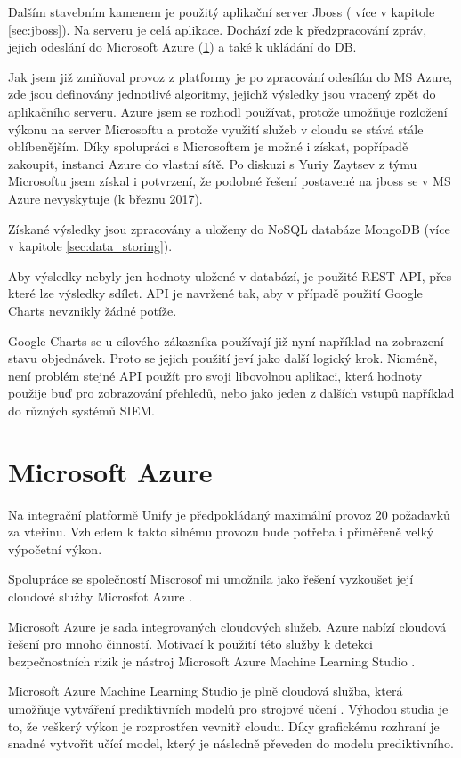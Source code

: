 \documentclass[thesis=M,czech]{FITthesis}[2012/10/20]
\begin{document}
	Dalším stavebním kamenem je použitý aplikační server Jboss ( více v kapitole \ref{sec:jboss}). Na serveru je celá aplikace. Dochází zde k předzpracování zpráv, jejich odeslání do Microsoft Azure (\ref{sec:ms_azure}) a také k ukládání do DB.
	
	Jak jsem již zmiňoval provoz z platformy je po zpracování odesílán do MS Azure, zde jsou definovány jednotlivé algoritmy, jejichž výsledky jsou vracený zpět do aplikačního serveru. Azure jsem se rozhodl používat, protože umožňuje rozložení výkonu na server Microsoftu a protože využití služeb v cloudu se stává stále oblíbenějším. Díky spolupráci s Microsoftem je možné i získat, popřípadě zakoupit, instanci Azure do vlastní sítě. Po diskuzi s Yuriy Zaytsev z týmu Microsoftu jsem získal i potvrzení, že podobné řešení postavené na jboss se v MS Azure nevyskytuje (k březnu 2017).
	
	Získané výsledky jsou zpracovány a uloženy do NoSQL databáze MongoDB (více v kapitole \ref{sec:data_storing}).
	
	Aby výsledky nebyly jen hodnoty uložené v databází, je použité REST API, přes které lze výsledky sdílet. API je navržené tak, aby v případě použití Google Charts nevznikly žádné potíže. 
	
	Google Charts se u cílového zákazníka používají již nyní například na zobrazení stavu objednávek. Proto se jejich použití jeví jako další logický krok. Nicméně, není problém stejné API použít pro svoji libovolnou aplikaci, která hodnoty použije buď pro zobrazování přehledů, nebo jako jeden z dalších vstupů například do různých systémů SIEM.

	\section{Microsoft Azure}
		\label{sec:ms_azure}
		Na integrační platformě Unify \cite{unify} je předpokládaný maximální provoz 20 požadavků za vteřinu. Vzhledem k takto silnému provozu bude potřeba i přiměřeně velký výpočetní výkon. 
			
		Spolupráce se společností Miscrosof \cite{microsoft} mi umožnila jako řešení vyzkoušet její cloudové služby Microsfot Azure \cite{msAzure}.
			
		Microsoft Azure je sada integrovaných cloudových služeb. Azure nabízí cloudová řešení pro mnoho činností. Motivací k použití této služby k detekci bezpečnostních rizik je nástroj Microsoft Azure Machine Learning Studio \cite{msAzureStudio}.
			
		Microsoft Azure Machine Learning Studio je plně cloudová služba, která umožňuje vytváření prediktivních modelů pro strojové učení \cite{msAzureStudio}. Výhodou studia je to, že veškerý výkon je rozprostřen vevnitř cloudu. Díky grafickému rozhraní je snadné vytvořit učící model, který je následně převeden do modelu prediktivního.
			
\end{document}

